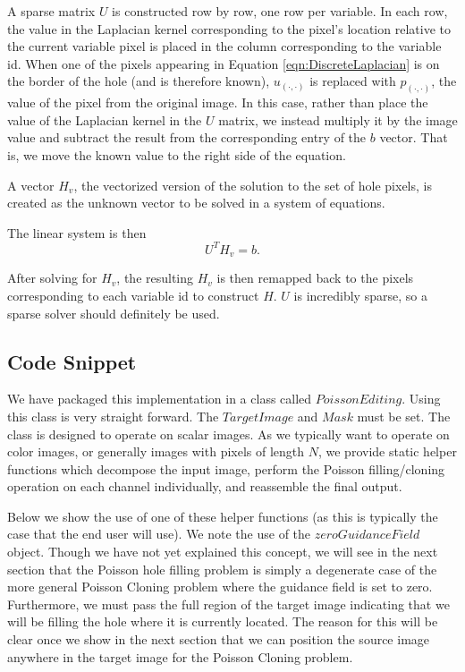 \documentclass{InsightArticle}
\begin{document}
A sparse matrix $U$ is constructed row by row, one row per variable. In each row, the value in the Laplacian kernel corresponding to the pixel's location relative to the current variable pixel is placed in the column corresponding to the variable id. When one of the pixels appearing in Equation \ref{eqn:DiscreteLaplacian} is on the border of the hole (and is therefore known), $u_{(\cdot,\cdot)}$ is replaced with $p_{(\cdot,\cdot)}$, the value of the pixel from the original image. In this case, rather than place the value of the Laplacian kernel in the $U$ matrix, we instead multiply it by the image value and subtract the result from the corresponding entry of the $b$ vector. That is, we move the known value to the right side of the equation.

A vector $H_v$, the vectorized version of the solution to the set of hole pixels, is created as the unknown vector to be solved in a system of equations.

The linear system is then
\begin{equation}
 U^T H_v = b.
\end{equation}

After solving for $H_v$, the resulting $H_v$ is then remapped back to the pixels corresponding to each variable id to construct $H$. $U$ is incredibly sparse, so a sparse solver should definitely be used.

\subsection{Code Snippet}
We have packaged this implementation in a class called $PoissonEditing$. Using this class is very straight forward. The $TargetImage$ and $Mask$ must be set. The class is designed to operate on scalar images. As we typically want to operate on color images, or generally images with pixels of length $N$, we provide static helper functions which decompose the input image, perform the Poisson filling/cloning operation on each channel individually, and reassemble the final output.

Below we show the use of one of these helper functions (as this is typically the case that the end user will use). We note the use of the $zeroGuidanceField$ object. Though we have not yet explained this concept, we will see in the next section that the Poisson hole filling problem is simply a degenerate case of the more general Poisson Cloning problem where the guidance field is set to zero. Furthermore, we must pass the full region of the target image indicating that we will be filling the hole where it is currently located. The reason for this will be clear once we show in the next section that we can position the source image anywhere in the target image for the Poisson Cloning problem.
\end{document}
